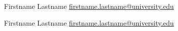

\begin{cventries}
    \cvofficer
    {Firstname Lastname}%
    {\hfill\href{mailto:firstname.lastname@university.edu}{firstname.lastname@university.edu}}%
    {}%

    \cvofficer
    {Firstname Lastname}%
    {\hfill\href{mailto:firstname.lastname@university.edu}{firstname.lastname@university.edu}}%
    {}%

\end{cventries}

